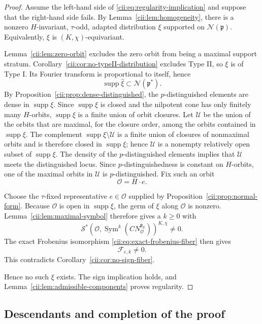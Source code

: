 \documentclass[10pt,a4paper]{amsart}
\numberwithin{equation}{section}
\newcommand{\R}{\mathbb R}
\newcommand{\Sym}{\operatorname{Sym}}
\newcommand{\supp}{\operatorname{supp}}
\newcommand{\cN}{\mathcal N}
\newcommand{\cS}{\mathcal S}
\begin{document}
\begin{proof}
Assume the left-hand side of
\eqref{cii:eq:regularity-implication} and suppose that the right-hand side
fails.  By Lemma~\ref{cii:lem:homogeneity}, there is a nonzero \(H\)-invariant,
\(\tau\)-odd, adapted distribution \(\xi\) supported on
\(\cN(\mathfrak p)\).  Equivalently, \(\xi\) is
\((K,\chi)\)-equivariant.

Lemma~\ref{cii:lem:zero-orbit} excludes the zero orbit from being a maximal
support stratum.  Corollary~\ref{cii:cor:no-typeII-distribution} excludes Type II, so
\(\xi\) is of Type I.  Its Fourier transform is proportional to itself,
hence
\[
\supp\widehat{\xi}\subset\cN(\mathfrak p^*).
\]
By Proposition~\ref{cii:prop:dense-distinguished},
the \(p\)-distinguished elements are dense in \(\supp\xi\).
Since \(\supp\xi\) is closed and the nilpotent cone has only finitely
many \(H\)-orbits, \(\supp\xi\) is a finite union of orbit closures.
Let \(\mathcal U\) be the union of the orbits that are maximal, for the
closure order, among the orbits contained in \(\supp\xi\).  The complement
\(\supp\xi\setminus\mathcal U\) is a finite union of closures of
nonmaximal orbits and is therefore closed in \(\supp\xi\); hence
\(\mathcal U\) is a nonempty relatively open subset of \(\supp\xi\).
The density of the \(p\)-distinguished elements implies that
\(\mathcal U\) meets the distinguished locus.  Since
\(p\)-distinguishedness is constant on \(H\)-orbits, one of the maximal
orbits in \(\mathcal U\) is \(p\)-distinguished.  Fix such an orbit
\[
  \mathcal O=H\cdot e.
\]

Choose the \(\tau\)-fixed representative
\(e\in\mathcal O\) supplied by Proposition~\ref{cii:prop:normal-form}.
Because \(\mathcal O\) is open in \(\supp\xi\), the germ of \(\xi\)
along \(\mathcal O\) is nonzero.
Lemma~\ref{cii:lem:maximal-symbol} therefore gives a \(k\geq0\) with
\[
  \cS^*\!\left(
    \mathcal O,
    \Sym^k(CN_{\mathcal O}^{\mathfrak p_{\R}})
  \right)^{K,\chi}\neq0.
\]
The exact Frobenius isomorphism \eqref{cii:eq:exact-frobenius-fiber} then gives
\[
  \mathcal F_{e,k}\neq0.
\]
This contradicts Corollary~\ref{cii:cor:no-sign-fiber}.

Hence no such \(\xi\) exists.  The sign implication holds, and
Lemma~\ref{cii:lem:admissible-components} proves regularity.
\end{proof}


\subsection{Descendants and completion of the proof}\label{cii:sec:descendants}
\end{document}
